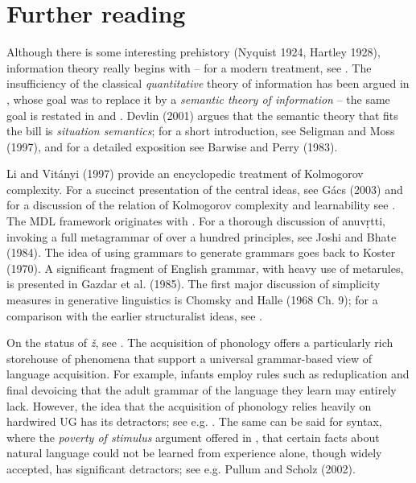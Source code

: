 
\section{Further reading}

Although there is some interesting prehistory (Nyquist 1924, Hartley 1928),
information theory really begins with  -- for a modern
treatment, see .  The insufficiency of the classical {\it
  quantitative} theory of information has been argued in
, whose goal was to replace it by a {\sl semantic
  theory of information} -- the same goal is restated in
 and . Devlin (2001) argues that
the semantic theory that fits the bill is {\it situation semantics}; for a
short introduction, see Seligman and Moss (1997), and for a detailed exposition
see Barwise and Perry (1983).  \nocite{Barwise:1983}\nocite{Seligman:1997}
\nocite{Nyquist:1924}\nocite{Hartley:1928}\nocite{Devlin:2001}

Li and Vit\'anyi (1997)\nocite{Li:1997} provide an encyclopedic treatment of
Kolmogorov complexity. For a succinct presentation of the central ideas, see
G\'acs (2003)\nocite{Ga1cs:2003} and for a discussion of the relation of
Kolmogorov complexity and learnability see .  The MDL
framework originates with .  For a thorough discussion
of anuv\d{r}tti, invoking a full metagrammar of over a hundred principles, see
Joshi and Bhate (1984).\nocite{Joshi:1984} The idea of using grammars to
generate grammars goes back to Koster (1970).\nocite{Koster:1970} A
significant fragment of English grammar, with heavy use of metarules, is
presented in Gazdar et al. (1985).\nocite{Gazdar:1985} The first major
discussion of simplicity measures in generative linguistics is Chomsky and
Halle (1968 Ch. 9); for a comparison with the earlier structuralist ideas, see
.

On the status of {\it \v{z}}, see . The acquisition of
phonology offers a particularly rich storehouse of phenomena that support a
universal grammar-based view of language acquisition. For example, infants
employ rules such as reduplication and final devoicing that the adult grammar
of the language they learn may entirely lack. However, the idea that the
acquisition of phonology relies heavily on hardwired UG has its detractors;
see e.g. \cite{Zamuner:2005}. The same can be said for syntax, where 
the {\it poverty of stimulus} argument offered
in , that certain facts about natural language could not 
be learned from experience alone, though widely accepted, has significant 
detractors; see e.g. Pullum and Scholz (2002).\nocite{Pullum:2002}


